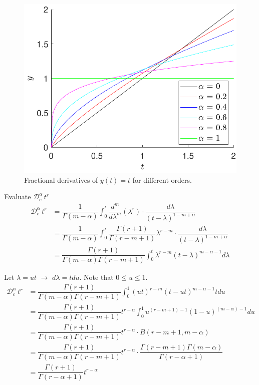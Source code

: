     \begin{figure}[H]
        \centering
        \includegraphics[scale=.5]{files/t_derivative.pdf}
        \caption{Fractional derivatives of $y(t)=t$ for different orders.}
        \label{fig:t_derivative}
    \end{figure}
    
    \begin{exmp}
        Evaluate $\mathcal{D}_c^\alpha\,t^r$
        \begin{align*}
        \mathcal{D}_c^\alpha\,t^r &= \dfrac{1}{\Gamma(m-\alpha)} \int_0^t \dfrac{d^m}{d\lambda^m}(\lambda^r)\cdot\dfrac{d\lambda}{(t-\lambda)^{1-m+\alpha}}\\
        & = \dfrac{1}{\Gamma(m-\alpha)}\int_0^t \dfrac{\Gamma(r+1)}{\Gamma(r-m+1)}\lambda^{r-m}\cdot\dfrac{d\lambda}{(t-\lambda)^{1-m+\alpha}}\\
        &= \dfrac{\Gamma(r+1)}{\Gamma(m-\alpha)\Gamma(r-m+1)}\int_0^t \lambda^{r-m}(t-\lambda)^{m-\alpha-1}d\lambda
    \end{align*}
    \end{exmp}
    Let $\lambda = u t$ $\rightarrow$ $d\lambda=tdu$. Note that $0\leq u\leq 1$.
    \begin{align*}
        \mathcal{D}_c^\alpha\,t^r &= \dfrac{\Gamma(r+1)}{\Gamma(m-\alpha)\Gamma(r-m+1)}\int_0^1 (u t)^{r-m}(t-u t)^{m-\alpha-1}tdu\\
        &=\dfrac{\Gamma(r+1)}{\Gamma(m-\alpha)\Gamma(r-m+1)}t^{r-\alpha}\int_0^1 u^{(r-m+1)-1}(1-u)^{(m-\alpha)-1}du\\
        &=\dfrac{\Gamma(r+1)}{\Gamma(m-\alpha)\Gamma(r-m+1)}t^{r-\alpha}\cdot B(r-m+1,m-\alpha)\\
        &=\dfrac{\Gamma(r+1)}{\Gamma(m-\alpha)\Gamma(r-m+1)}t^{r-\alpha}\cdot\dfrac{\Gamma(r-m+1)\Gamma(m-\alpha)}{\Gamma(r-\alpha+1)}\\
        &= \dfrac{\Gamma(r+1)}{\Gamma(r-\alpha+1)}t^{r-\alpha}\\
    \end{align*}
    
